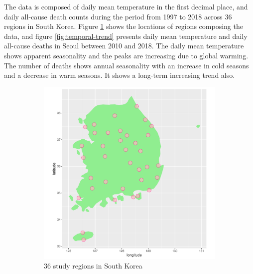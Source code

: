 \documentclass[12pt]{article}
\begin{document}
The data is composed of daily mean temperature in the first decimal place, and
daily all-cause death counts during the period from 1997 to 2018 across 36 regions in South Korea.
Figure \ref{fig:regions} shows the locations of regions composing the data,
and figure \ref{fig:temporal-trend}
presents daily mean temperature and daily all-cause deaths in Seoul between 2010 and 2018.
The daily mean temperature shows apparent seasonality and 
the peaks are increasing due to global warming.
The number of deaths shows annual seasonality 
with an increase in cold seasons and a decrease in warm seasons.
It shows a long-term increasing trend also.

\begin{figure}
	\centering
	\begin{subfigure}[b]{0.5\textwidth}
		\includegraphics[width = \textwidth]{figures/kor-map.pdf}
		\caption{36 study regions in South Korea}
		\label{fig:regions}
	\end{subfigure}~%
	\begin{subfigure}[b]{0.5\textwidth}

\end{subfigure}
\end{figure}
\end{document}
